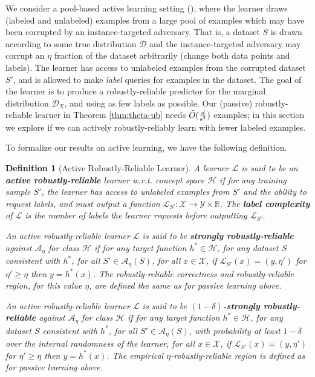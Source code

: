 \documentclass[11pt]{article}
\newtheorem{definition}{Definition}
\newcommand{\R}{\mathbb{R}}
\newcommand{\0}{\mathbf{0}}
\newcommand{\1}{\mathbf{1}}
\newcommand{\cA}{\mathcal{A}}
\newcommand{\cD}{\mathcal{D}}
\newcommand{\cH}{\mathcal{H}}
\newcommand{\cL}{\mathcal{L}}
\newcommand{\cY}{\mathcal{Y}}
\newcommand{\cX}{\mathcal{X}}
\newcommand{\changed}[1]{#1}
\begin{document}
We consider a pool-based active learning setting (\cite{settles2009active}), where the learner draws (labeled and unlabeled) examples from a large pool of examples which may have been corrupted by an instance-targeted adversary. That is, a dataset $S$ is drawn according to some true distribution $\cD$ and the instance-targeted adversary may corrupt an $\eta$ fraction of the dataset arbitrarily (change both data points and labels). The learner has access to unlabeled examples from the corrupted dataset $S'$, and is allowed to make {\it label} queries for examples in the dataset.
The goal of the learner is to produce a robustly-reliable predictor for the marginal distribution $\cD_X$, and using as few labels as possible. Our (passive) robustly-reliable learner in Theorem \ref{thm:theta-ub} needs $\Tilde{O}(\frac{d}{\epsilon^2})$ examples; in this section we explore if we can \changed{actively robustly-reliably learn with fewer labeled examples.}


To formalize our results on active learning,
we have the following definition.

\begin{definition}[Active Robustly-Reliable Learner]
A learner $\cL$ is said to be an {\bf active robustly-reliable} learner w.r.t. concept space $\cH$ if for any training sample $S'$, the learner has access to unlabeled examples from $S'$ and the ability to request labels, and must output a function $\cL_{S'}:\cX \rightarrow\cY\times\R$. The {\bf label complexity} of $\cL$ is the number of labels the learner requests before outputting $\cL_{S'}$.

An active robustly-reliable learner $\cL$ is said to be {\bf strongly robustly-reliable} against $\cA_\eta$ for class $\cH$ if for any target function $h^*\in\cH$, for any dataset $S$ consistent with $h^*$, for all $S' \in \cA_\eta(S)$, for all $x\in\cX$, if $\cL_{S'}(x)=(y,\eta')$ for $\eta'\geq \eta$ then $y= h^*(x)$.  \changed{The robustly-reliable correctness and robustly-reliable region, for this value $\eta$, are defined the same as for passive learning above.}

An active robustly-reliable learner $\cL$ is said to be {\bf $(1-\delta)$-strongly robustly-reliable} against $\cA_\eta$ for class $\cH$ if for any target function $h^*\in\cH$, for any dataset $S$ consistent with $h^*$, for all $S' \in \cA_\eta(S)$, with probability at least $1-\delta$ over the internal randomness of the learner, for all $x\in\cX$, if $\cL_{S'}(x)=(y,\eta')$ for $\eta'\geq \eta$ then $y= h^*(x)$.
The empirical $\eta$-robustly-reliable region is defined as for
passive learning above.
 \label{def:acl_nasty}
\end{definition}
\end{document}
